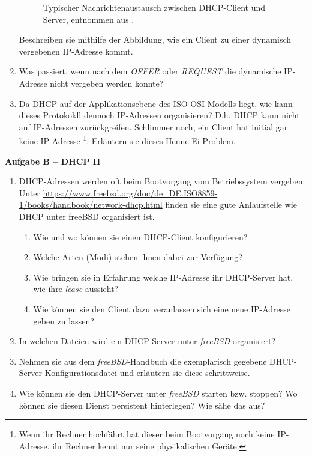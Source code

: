\documentclass[paper=a4,fontsize=11pt]{scrartcl}%
\numberwithin{equation}{section}
\begin{document}
\begin{enumerate}
\begin{figure}[H]
	\caption{Typischer Nachrichtenaustausch zwischen DHCP-Client und Server, entnommen aus \cite[S. 240]{fall2011tcp}.}
	\label{dhcp_exchange}
	\end{figure}
	Beschreiben sie mithilfe der Abbildung, wie ein Client zu einer dynamisch vergebenen IP-Adresse kommt.
	\item Was passiert, wenn nach dem \emph{OFFER} oder \emph{REQUEST} die dynamische IP-Adresse nicht vergeben werden konnte?
	\item Da DHCP auf der Applikationsebene des ISO-OSI-Modells liegt, wie kann dieses Protokokll dennoch IP-Adressen organisieren? D.h. DHCP kann nicht auf IP-Adressen zurückgreifen. Schlimmer noch, ein Client hat initial gar keine IP-Adresse \footnote{Wenn ihr Rechner hochfährt hat dieser beim Bootvorgang noch keine IP-Adresse, ihr Rechner kennt nur seine physikalischen Geräte.}. Erläutern sie dieses Henne-Ei-Problem. 
\end{enumerate}

\begin{center}
\Large{\textbf{Aufgabe B -- DHCP II}}
\end{center}
\vskip0.25in

\begin{enumerate}
	\item DHCP-Adressen werden oft beim Bootvorgang vom Betriebssystem vergeben. Unter \url{https://www.freebsd.org/doc/de_DE.ISO8859-1/books/handbook/network-dhcp.html} finden sie eine gute Anlaufstelle wie DHCP unter freeBSD organisiert ist.
	\begin{enumerate}
		\item Wie und wo können sie einen DHCP-Client konfigurieren?
		\item Welche Arten (Modi) stehen ihnen dabei zur Verfügung?
		\item Wie bringen sie in Erfahrung welche IP-Adresse ihr DHCP-Server hat, wie ihre \emph{lease} aussieht?
		\item Wie können sie den Client dazu veranlassen sich eine neue IP-Adresse geben zu lassen?
	\end{enumerate}
	\item In welchen Dateien wird ein DHCP-Server unter \emph{freeBSD} organisiert?
	\item Nehmen sie aus dem \emph{freeBSD}-Handbuch die exemplarisch gegebene DHCP-Server-Konfigurationsdatei und erläutern sie diese schrittweise.
	\item Wie können sie den DHCP-Server unter \emph{freeBSD} starten bzw. stoppen? Wo können sie diesen Dienst persistent hinterlegen? Wie sähe das aus?
\end{enumerate}
\end{document}
